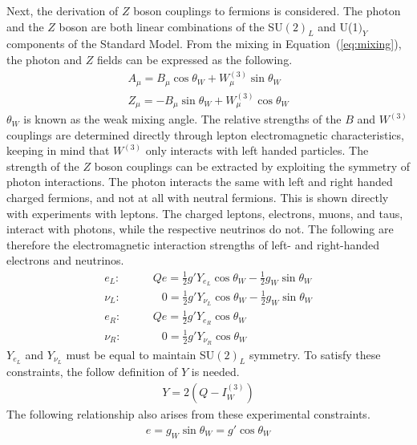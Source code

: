 Next, the derivation of $Z$ boson couplings to fermions is considered.
The photon and the $Z$ boson are both linear combinations of the
SU$(2)_L$ and U(1$)_Y$ components of the Standard Model.
From the mixing in Equation~(\ref{eq:mixing}),
the photon and $Z$ fields can be expressed as the following.
\begin{gather}
  A_\mu = B_\mu \cos \theta_W + W_\mu^{(3)} \sin \theta_W \\
  Z_\mu = - B_\mu \sin \theta_W + W_\mu^{(3)} \cos \theta_W \label{eq:z-force}
\end{gather}
$\theta_W$ is known as the weak mixing angle.
The relative strengths of the $B$ and $W^{(3)}$ couplings
are determined directly through lepton electromagnetic characteristics,
keeping in mind that $W^{(3)}$ only interacts with left handed particles.
The strength of the $Z$ boson couplings can be extracted by exploiting the symmetry of photon interactions.
The photon interacts the same with left and right handed charged fermions,
and not at all with neutral fermions.
This is shown directly with experiments with leptons.
The charged leptons, electrons, muons, and taus, interact with photons,
while the respective neutrinos do not.
The following are therefore the electromagnetic interaction strengths
of left- and right-handed electrons and neutrinos.
\begin{align}
  e_L:& \qquad Qe = \frac12 g' Y_{e_L} \cos \theta_W - \frac12 g_W \sin \theta_W \\
  \nu_L:& \qquad \phantom{Q}0 = \frac12 g' Y_{\nu_L} \cos \theta_W - \frac12 g_W \sin \theta_W \\
  e_R:& \qquad Qe = \frac12 g' Y_{e_R} \cos \theta_W \\
  \nu_R:& \qquad \phantom{Q}0 = \frac12 g' Y_{\nu_R} \cos \theta_W
\end{align}
$Y_{e_L}$ and $Y_{\nu_L}$ must be equal to maintain SU$(2)_L$ symmetry.
To satisfy these constraints, the follow definition of $Y$ is needed.
\begin{gather}
  Y = 2\left(Q - I_W^{(3)}\right)
\end{gather}
The following relationship also arises from these experimental constraints.
\begin{gather}
  e = g_W \sin \theta_W = g' \cos \theta_W
\end{gather}

